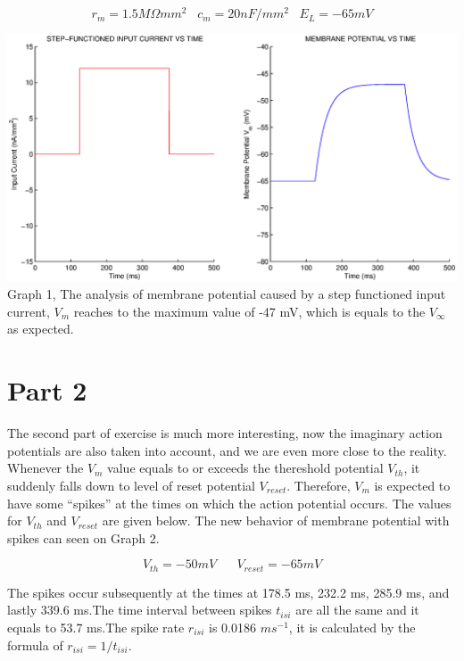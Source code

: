 \documentclass{article}
\begin{document}
\begin{equation*}
r_{m}=1.5 M \Omega mm^{2}\,\,\,\,\,c_{m}=20nF/mm^{2}\,\,\,\,\,E_{L}=-65mV
\end{equation*}

\begin{center}
 \includegraphics[width=\textwidth]{Exercise3/q7.eps}
Graph 1, The analysis of membrane potential caused by a step functioned input current, $V_{m}$ reaches to the maximum value of -47 mV, which is equals to the $V_{\infty}$ as expected.
\end{center}


\section*{Part 2}
The second part of exercise is much more interesting, now the imaginary action potentials are also taken into account, and we are even more close to the reality. Whenever the $V_{m}$ value equals to or exceeds the thereshold potential $V_{th}$, it suddenly falls down to level of reset potential $V_{reset}$. Therefore, $V_{m}$ is expected to have some ``spikes'' at the times on which the action potential occurs. The values for $V_{th}$ and $V_{reset}$ are given below. The new behavior of membrane potential with spikes can seen on Graph 2.

\begin{equation*}
V_{th}=-50 mV \,\,\,\,\,\,\,\,\,\,V_{reset}=-65 mV
\end{equation*}

The spikes occur subsequently at the times at 178.5 ms, 232.2 ms, 285.9 ms, and lastly 339.6 ms.The time interval between spikes $t_{isi}$ are all the same and it equals to 53.7 ms.The spike rate $r_{isi}$ is 0.0186 $ms^{-1}$, it is calculated by the formula of $r_{isi}=1/t_{isi}$.
\end{document}
